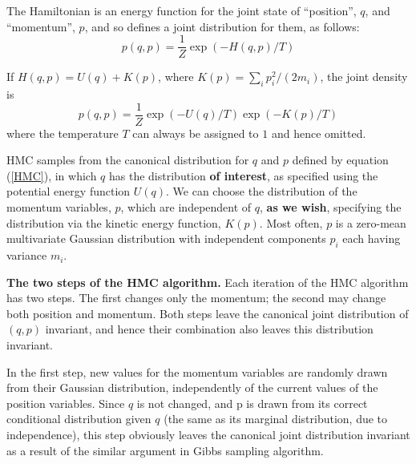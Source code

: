 \documentclass[a4paper]{book}
\begin{document}
The Hamiltonian is an energy function for the joint state of ``position'', $q$, and ``momentum'', $p$, and so defines a joint distribution for them, as follows:
\begin{equation}
	p(q,p) = \frac{1}{Z} \exp (-H(q,p)/T)
\end{equation}

If $H(q,p) = U(q)+K(p)$, where $K(p) = \sum_i p_i^2 /(2m_i)$, the joint density is
\begin{equation}
	p(q,p) = \frac{1}{Z} \exp(-U(q)/T) \exp(-K(p)/T) \label{HMC}
\end{equation}
where the temperature $T$ can always be assigned to $1$ and hence omitted.

HMC samples from the canonical distribution for $q$ and $p$ defined by equation (\ref{HMC}), in which $q$ has the distribution \textbf{of interest}, as specified using the potential energy function $U(q)$. We can choose the distribution of the momentum variables, $p$, which are independent of $q$, \textbf{as we wish}, specifying the distribution via the kinetic energy function, $K(p)$. Most often, $p$ is a zero-mean multivariate Gaussian distribution with independent components $p_i$ each having variance $m_i$. 

\textbf{The two steps of the HMC algorithm.} Each iteration of the HMC algorithm has two
steps. The first changes only the momentum; the second may change both position and
momentum. Both steps leave the canonical joint distribution of $(q, p)$ invariant, and hence
their combination also leaves this distribution invariant.

In the first step, new values for the momentum variables are randomly drawn from their
Gaussian distribution, independently of the current values of the position variables. Since $q$ is not changed, and p is drawn from its correct conditional distribution given $q$ (the same as its marginal distribution, due to independence),
this step obviously leaves the canonical joint distribution invariant as a result of the similar argument in Gibbs sampling algorithm.
\end{document}
